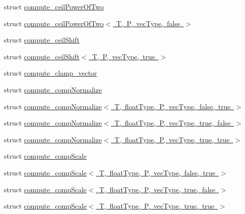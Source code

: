 \begin{DoxyCompactItemize}
\item 
struct \mbox{\hyperlink{structglm_1_1detail_1_1compute__ceil_power_of_two}{compute\+\_\+ceil\+Power\+Of\+Two}}
\item 
struct \mbox{\hyperlink{structglm_1_1detail_1_1compute__ceil_power_of_two_3_01_t_00_01_p_00_01vec_type_00_01false_01_4}{compute\+\_\+ceil\+Power\+Of\+Two$<$ T, P, vec\+Type, false $>$}}
\item 
struct \mbox{\hyperlink{structglm_1_1detail_1_1compute__ceil_shift}{compute\+\_\+ceil\+Shift}}
\item 
struct \mbox{\hyperlink{structglm_1_1detail_1_1compute__ceil_shift_3_01_t_00_01_p_00_01vec_type_00_01true_01_4}{compute\+\_\+ceil\+Shift$<$ T, P, vec\+Type, true $>$}}
\item 
struct \mbox{\hyperlink{structglm_1_1detail_1_1compute__clamp__vector}{compute\+\_\+clamp\+\_\+vector}}
\item 
struct \mbox{\hyperlink{structglm_1_1detail_1_1compute__comp_normalize}{compute\+\_\+comp\+Normalize}}
\item 
struct \mbox{\hyperlink{structglm_1_1detail_1_1compute__comp_normalize_3_01_t_00_01float_type_00_01_p_00_01vec_type_00_01false_00_01true_01_4}{compute\+\_\+comp\+Normalize$<$ T, float\+Type, P, vec\+Type, false, true $>$}}
\item 
struct \mbox{\hyperlink{structglm_1_1detail_1_1compute__comp_normalize_3_01_t_00_01float_type_00_01_p_00_01vec_type_00_01true_00_01false_01_4}{compute\+\_\+comp\+Normalize$<$ T, float\+Type, P, vec\+Type, true, false $>$}}
\item 
struct \mbox{\hyperlink{structglm_1_1detail_1_1compute__comp_normalize_3_01_t_00_01float_type_00_01_p_00_01vec_type_00_01true_00_01true_01_4}{compute\+\_\+comp\+Normalize$<$ T, float\+Type, P, vec\+Type, true, true $>$}}
\item 
struct \mbox{\hyperlink{structglm_1_1detail_1_1compute__comp_scale}{compute\+\_\+comp\+Scale}}
\item 
struct \mbox{\hyperlink{structglm_1_1detail_1_1compute__comp_scale_3_01_t_00_01float_type_00_01_p_00_01vec_type_00_01false_00_01true_01_4}{compute\+\_\+comp\+Scale$<$ T, float\+Type, P, vec\+Type, false, true $>$}}
\item 
struct \mbox{\hyperlink{structglm_1_1detail_1_1compute__comp_scale_3_01_t_00_01float_type_00_01_p_00_01vec_type_00_01true_00_01false_01_4}{compute\+\_\+comp\+Scale$<$ T, float\+Type, P, vec\+Type, true, false $>$}}
\item 
struct \mbox{\hyperlink{structglm_1_1detail_1_1compute__comp_scale_3_01_t_00_01float_type_00_01_p_00_01vec_type_00_01true_00_01true_01_4}{compute\+\_\+comp\+Scale$<$ T, float\+Type, P, vec\+Type, true, true $>$}}

\end{DoxyCompactItemize}
